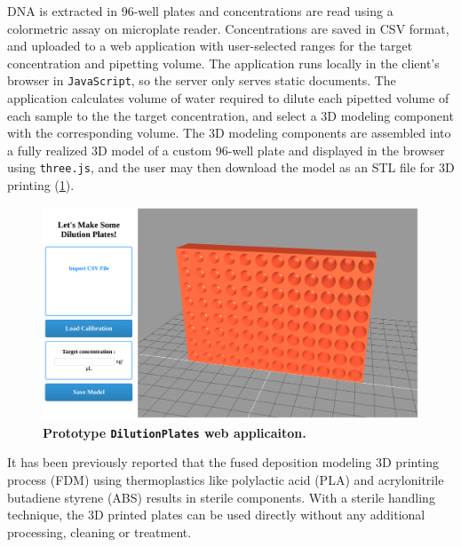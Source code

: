 \begin{refsection}
DNA is extracted in 96-well plates and concentrations are read using a colormetric assay on microplate reader. Concentrations are saved in CSV format, and uploaded to a web application with user-selected ranges for the target concentration and pipetting volume. The application runs locally in the client's browser in {\tt JavaScript}, so the server only serves static documents. The application calculates volume of water required to dilute each pipetted volume of each sample to the the target concentration, and select a 3D modeling component with the corresponding volume. The 3D modeling components are assembled into a fully realized 3D model of a custom 96-well plate and displayed in the browser using {\tt three.js}, and the user may then download the model as an STL file for 3D printing (\ref{DP_fig1}). 

\begin{figure}
    \centering
    \includegraphics[width=\textwidth]{DilutionPlates/figures/fig1}
    \caption{\textbf{Prototype {\tt DilutionPlates} web applicaiton.}}
    \label{DP_fig1}
\end{figure}

It has been previously reported that the fused deposition modeling 3D printing process (FDM) using thermoplastics like polylactic acid (PLA) and acrylonitrile butadiene styrene (ABS) results in sterile components. With a sterile handling technique, the 3D printed plates can be used directly without any additional processing, cleaning or treatment.


\end{refsection}
